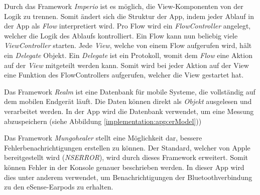 Durch das Framework \textit{Imperio} ist es möglich, die View-Komponenten von der Logik zu trennen. 
Somit ändert sich die Struktur der App, indem jeder Ablauf in der App als \textit{Flow} interpretiert wird. 
Pro Flow wird ein \textit{FlowController} angelegt, welcher die Logik des Ablaufs kontrolliert. 
Ein Flow kann nun beliebig viele \textit{ViewController} starten.
Jede \textit{View}, welche von einem Flow aufgerufen wird, hält ein \textit{Delegate} Objekt.
Ein \textit{Delegate} ist ein Protokoll, womit dem \textit{Flow} eine Aktion auf der \textit{View} mitgeteilt werden kann.
Somit wird bei jeder Aktion auf der View eine Funktion des FlowControllers aufgerufen, welcher die View gestartet hat.


Das Framework \textit{Realm} ist eine Datenbank für mobile Systeme, die vollständig auf dem mobilen Endgerät läuft.
Die Daten können direkt als \textit{Objekt} ausgelesen und verarbeitet werden.
In der App wird die Datenbank verwendet, um eine Messung abzuspeichern (siehe Abbildung \ref{implementation:app:erModel}))

Das Framework \textit{Mungohealer} stellt eine Möglichkeit dar, bessere Fehlerbenachrichtigungen erstellen zu können. 
Der Standard, welcher von Apple bereitgestellt wird (\textit{NSERROR}), wird durch dieses Framework erweitert.
Somit können Fehler in der Konsole genauer beschrieben werden. 
In dieser App wird dies unter anderem verwendet, um Benachrichtigungen der Bluetoothverbindung zu den eSense-Earpods zu erhalten.